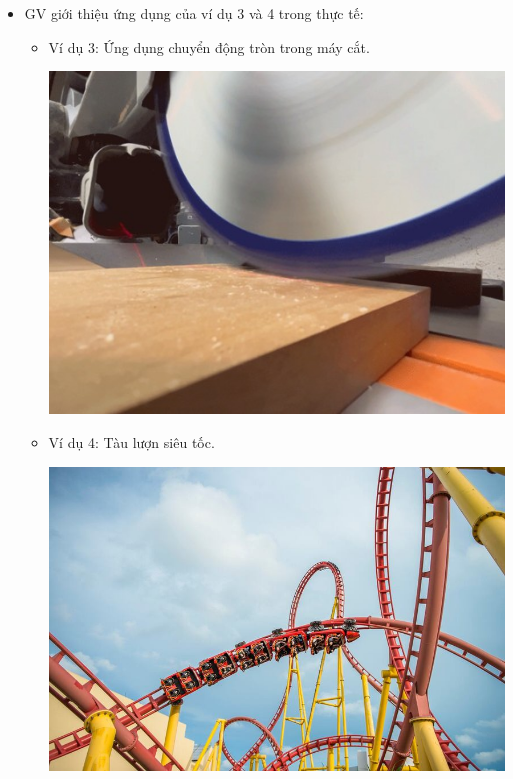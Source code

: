 {\begin{itemize}
	\item GV giới thiệu ứng dụng của ví dụ 3 và 4 trong thực tế:
	\begin{itemize}
		\item Ví dụ 3: Ứng dụng chuyển động tròn trong máy cắt.
		\begin{center}
			\includegraphics[scale=0.4]{figs/G10-BAI21-10}
		\end{center}
		\item Ví dụ 4: Tàu lượn siêu tốc.
		\begin{center}
			\includegraphics[scale=0.25]{figs/G10-BAI21-11}
		\end{center}
	\end{itemize}
\end{itemize}
}
